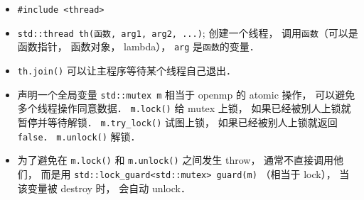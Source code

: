 
\begin{itemize}
\item \verb|#include <thread>|
\item \verb|std::thread th(函数, arg1, arg2, ...)|; 创建一个线程， 调用\verb|函数|（可以是函数指针， 函数对象， lambda）， \verb|arg| 是\verb|函数|的变量．
\item \verb|th.join()| 可以让主程序等待某个线程自己退出．
\item 声明一个全局变量 \verb|std::mutex m| 相当于 openmp 的 atomic 操作， 可以避免多个线程操作同意数据． \verb|m.lock()| 给 mutex 上锁， 如果已经被别人上锁就暂停并等待解锁． \verb|m.try_lock()| 试图上锁， 如果已经被别人上锁就返回 \verb|false|． \verb|m.unlock()| 解锁．
\item 为了避免在 \verb|m.lock()| 和 \verb|m.unlock()| 之间发生 throw， 通常不直接调用他们， 而是用 \verb|std::lock_guard<std::mutex> guard(m)| （相当于 lock）， 当该变量被 destroy 时， 会自动 unlock．
\end{itemize}
